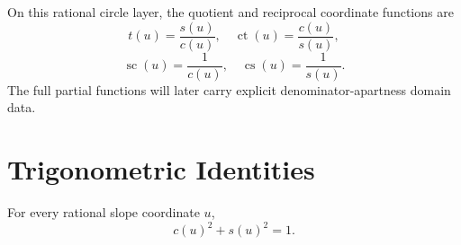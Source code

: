 \begin{definition}
\label{def:rational-circle-other-trig}
On this rational circle layer, the quotient and reciprocal coordinate
functions are
\[
  t(u)=\frac{s(u)}{c(u)},\quad
  \operatorname{ct}(u)=\frac{c(u)}{s(u)},
\]
\[
  \operatorname{sc}(u)=\frac1{c(u)},\quad
  \operatorname{cs}(u)=\frac1{s(u)}.
\]
The full partial functions will later carry explicit denominator-apartness
domain data.
\end{definition}

\section{Trigonometric Identities}

\begin{theorem}
\label{thm:rational-circle-pythagorean}
\leanok
For every rational slope coordinate \(u\),
\[
  c(u)^2+s(u)^2=1.
\]
\end{theorem}

